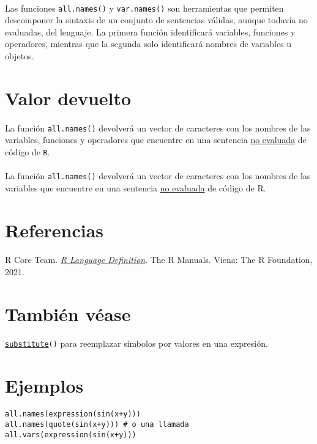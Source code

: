 \documentclass{article}[letter, 12pt]
\newlength\tindent
\renewcommand{\indent}{\hspace*{\tindent}}
\def\code#1{\texttt{#1}}
\def\codename#1{\texttt{\color{gray}\small#1}}
\begin{document}
\paragraph{}
Las funciones \code{all.names()} y \code{var.names()} son herramientas que permiten descomponer la sintaxis de un conjunto de sentencias válidas, aunque todavía no evaluadas, del lenguaje. La primera función identificará variables, funciones y operadores, mientras que la segunda solo identificará nombres de variables u objetos.
\section{\color{gray}Valor devuelto}
\paragraph{}
La función \code{all.names()} devolverá un vector de caracteres con los nombres de las variables, funciones y operadores que encuentre en una sentencia \href{run:/Vocabulary.pdf}{no evaluada} de código de \codename{R}.
\paragraph{}
La función \code{all.names()} devolverá un vector de caracteres con los nombres de las variables que encuentre en una sentencia \href{run:/Vocabulary.pdf}{no evaluada} de código de R.
\section{\color{gray}Referencias}
\paragraph{}
R Core Team. \href{https://cran.r-project.org/doc/manuals/R-lang.html}{\textit{R Language Definition}}. The R Manuals. Viena: The R Foundation, 2021.
\section{\color{gray}También véase}
\paragraph{}
\href{run:/Vocabulary.pdf}{\code{substitute}}\code{()} para reemplazar símbolos por valores en una expresión.
\section{\color{gray}Ejemplos}
\indent\code{all.names(expression(sin(x+y)))} \\
\indent\code{all.names(quote(sin(x+y)))  \# o una llamada} \\
\indent\code{all.vars(expression(sin(x+y)))} \\
\end{document}
